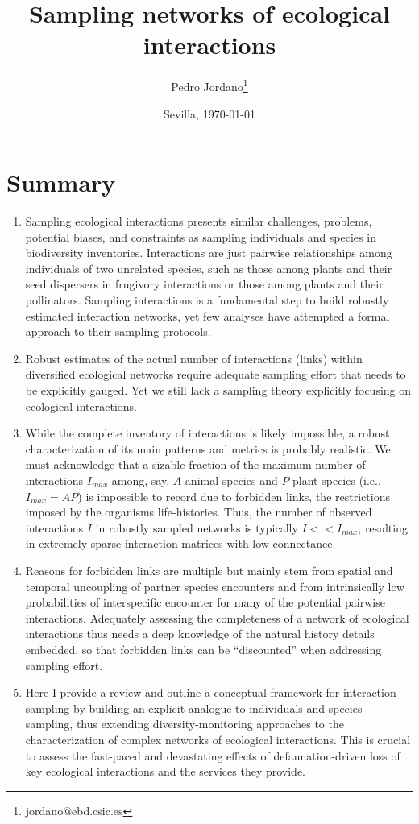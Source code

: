 \documentclass[12pt]{article}
\title{Sampling networks of ecological interactions}
\author[a]{Pedro Jordano\thanks{jordano@ebd.csic.es}}
\affil[a]{Integrative Ecology Group, Estaci\'on Biol\'ogica de Do\~nana, Consejo Superior de Investigaciones Cient\'ificas (EBD-CSIC), Avenida Americo Vespucio s\slash n, E--41092 Sevilla, Spain}
\date{Sevilla, \today}
\begin{document}
\maketitle
\section*{Summary}
\begin{enumerate}
\item Sampling ecological interactions presents similar challenges, problems, potential biases, and constraints as sampling individuals and species in biodiversity inventories. Interactions are just pairwise relationships among individuals of two unrelated species, such as those among plants and their seed dispersers in frugivory interactions or those among plants and their pollinators. Sampling interactions is a fundamental step to build robustly estimated interaction networks, yet few analyses have attempted a formal approach to their sampling protocols.

\item Robust estimates of the actual number of interactions (links) within diversified ecological networks require adequate sampling effort that needs to be explicitly gauged. Yet we still lack a sampling theory explicitly focusing on ecological interactions.

\item While the complete inventory of interactions is likely impossible, a robust characterization of its main patterns and metrics is probably realistic. We must acknowledge that a sizable fraction of the maximum number of interactions $I_{max}$ among, say, $A$ animal species and $P$ plant species (i.e., $I_{max}= AP$) is impossible to record due to forbidden links, the restrictions imposed by the organisms life-histories. Thus, the number of observed interactions $I$ in robustly sampled networks is typically $I<<I_{max}$, resulting in extremely sparse interaction matrices with low connectance.

\item Reasons for forbidden links are multiple but mainly stem from spatial and temporal uncoupling of partner species encounters and from intrinsically low probabilities of interspecific encounter for many of the potential pairwise interactions. Adequately assessing the completeness of a network of ecological interactions thus needs a deep knowledge of the natural history details embedded, so that forbidden links can be ``discounted'' when addressing sampling effort.

\item Here I provide a review and outline a conceptual framework for interaction sampling by building an explicit analogue to individuals and species sampling, thus extending diversity-monitoring approaches to the characterization of complex networks of ecological interactions. This is crucial to assess the fast-paced and devastating effects of defaunation-driven loss of key ecological interactions and the services they provide.
\end{enumerate}
%
\end{document}
